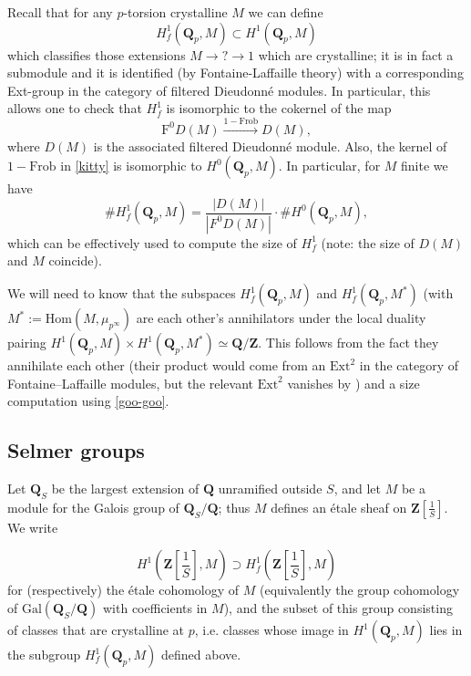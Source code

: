 \documentclass[10pt]{amsart}
\newcommand{\Z}{\mathbf{Z}}
\newcommand{\Gal}{\mathrm{Gal}}
\newcommand{\Ext}{\mathrm{Ext}}
\newcommand{\Hom}{\mathrm{Hom}}
\newcommand{\Q}{\mathbf{Q}}
\newcommand{\ramprimes}{S}
\theoremstyle{remark}
\begin{document}
Recall that for any $p$-torsion  crystalline $M$   
we can define
$$  H^1_f(\Q_p, M) \subset H^1(\Q_p, M) $$
which classifies those extensions $M \rightarrow  ? \rightarrow 1$ which are crystalline;
it is in fact a submodule and it is identified (by Fontaine-Laffaille theory) with a corresponding Ext-group in the category
of filtered Dieudonn{\'e} modules. In particular,  this allows one to check that
$H^1_f$ is isomorphic to the cokernel of the map 
\begin{equation} \label{kitty}
\mathrm{F}^0 D(M) \stackrel{1 - \mathrm{Frob}}{\rightarrow} D(M),\end{equation}
where $D(M)$ is the associated filtered Dieudonn{\'e} module. 
Also, the kernel of  $1-\mathrm{Frob}$  in \eqref{kitty} is isomorphic to $H^0(\Q_p, M)$. In particular, for $M$ finite we have 
\begin{equation} \label{goo-goo} \# H^1_f(\Q_p, M) = \frac{ | D(M)|}{|F^0 D(M)|} \cdot \# H^0(\Q_p, M),\end{equation} 
 which can be effectively 
 used to compute the size of $H^1_f$ (note: the size of $D(M)$ and $M$ coincide).
 
We will need to know that the subspaces $H^1_f(\Q_p, M)$ and $H^1_f(\Q_p, M^*)$
(with $M^* := \Hom(M, \mu_{p^{\infty}})$ are each other's annihilators 
under the local duality pairing $H^1(\Q_p, M) \times H^1(\Q_p, M^*) \simeq \Q/\Z$. 
This follows from the fact they annihilate each other  (their product would come from an $\Ext^2$
in the category of Fontaine--Laffaille modules, but the relevant $\Ext^2$ vanishes by \cite[Lemma 4.4]{BK})  and a size computation
using \eqref{goo-goo}.

\subsection{Selmer groups}

Let $\Q_{\ramprimes}$ 
be the largest extension of $\Q$ unramified outside 
$\ramprimes$, and let $M$ be a module for the Galois group of $\Q_{\ramprimes}/\Q$;
thus $M$ defines an {\'e}tale sheaf on $\Z[\frac{1}{\ramprimes}]$. 
We write

$$H^1(\Z[\frac{1}{S}], M) \supset H^1_f(\Z[\frac{1}{S}], M)$$
for (respectively) the {\'e}tale cohomology of $M$ (equivalently the group cohomology
of $\Gal(\Q_{\ramprimes}/\Q)$ with coefficients in $M$),
and the subset of this group consisting of classes that are crystalline at $p$, i.e. classes
whose image in $H^1(\Q_p, M)$ lies in the subgroup $H^1_f(\Q_p, M)$ defined above.
\end{document}

